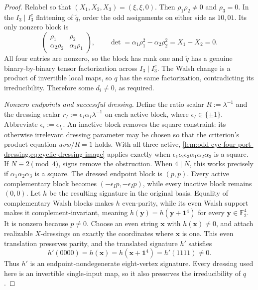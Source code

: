 \documentclass[11pt,letterpaper,onecolumn]{article}
\theoremstyle{plain}
\theoremstyle{definition}
\theoremstyle{remark}
\newcommand{\Ftwo}{\mathbb F_2}
\newcommand{\one}{\mathbf 1}
\begin{document}
\begin{proof}
Relabel so that \((X_1,X_2,X_3)=(\xi,\xi,0)\).  Then
\(\rho_1\rho_2\ne0\) and \(\rho_3=0\).  In the
\(I_3\mid I_3^c\) flattening of \(\widetilde q\), order the odd assignments
on either side as \(10,01\).  Its only nonzero block is
\begin{equation*}
 \begin{pmatrix}
  \rho_1&\rho_2\\
  \alpha_2\rho_2&\alpha_1\rho_1
 \end{pmatrix},
 \qquad
 \det=\alpha_1\rho_1^2-\alpha_2\rho_2^2=X_1-X_2=0.
\end{equation*}
All four entries are nonzero, so the block has rank one and
\(\widetilde q\) has a genuine binary-by-binary tensor factorization across
\(I_3\mid I_3^c\).  The Walsh change is a product of invertible local maps,
so \(q\) has the same factorization, contradicting its irreducibility.
Therefore some \(d_i\ne0\), as required.

\emph{Nonzero endpoints and successful dressing.}
Define the ratio scalar \(R:=\lambda^{-1}\) and the dressing scalar
\(r_I:=\epsilon_I\alpha_I\lambda^{-1}\) on each active block, where
\(\epsilon_I\in\{\pm1\}\). Abbreviate
\(\epsilon_i:=\epsilon_{I_i}\).  An inactive block removes the square
constraint: its otherwise irrelevant dressing parameter may be chosen so
that the criterion's product equation \(uvw/R=1\) holds.
With all three active,
\cref{lem:odd-cyc-four-port-dressing,eq:cyclic-dressing-image} applies
exactly when
\(\epsilon_1\epsilon_2\epsilon_3
 \alpha_1\alpha_2\alpha_3\) is a square.  If
\(N\equiv2\pmod4\), signs remove the obstruction. When \(4\mid N\), this
works precisely if \(\alpha_1\alpha_2\alpha_3\) is a square.  The dressed
endpoint block is \((p,p)\). Every active complementary block becomes
\((-\epsilon_Ip,-\epsilon_Ip)\), while every inactive block remains
\((0,0)\).  Let \(h\) be
the resulting signature in the original basis.  Equality of complementary Walsh blocks
makes \(h\) even-parity, while its even Walsh support makes it
  complement-invariant, meaning
  \(h({\mathbf{y}})=h({\mathbf{y}}+\one^4)\) for every \({\mathbf{y}}\in\Ftwo^4\). It is nonzero because
  \(p\ne0\).  Choose an even
string \({\mathbf{x}}\) with \(h({\mathbf{x}})\ne0\), and attach realizable \(X\)-dressings on
exactly the coordinates where \({\mathbf{x}}\) is one.  This even translation preserves
parity, and the translated signature \(h'\) satisfies
\[
 h'(0000)=h({\mathbf{x}})=h({\mathbf{x}}+\one^4)=h'(1111)\ne0.
\]
Thus \(h'\) is an endpoint-nondegenerate eight-vertex signature.  Every
dressing used here is an invertible single-input map, so it also preserves the
irreducibility of \(q\).


\end{proof}
\end{document}
